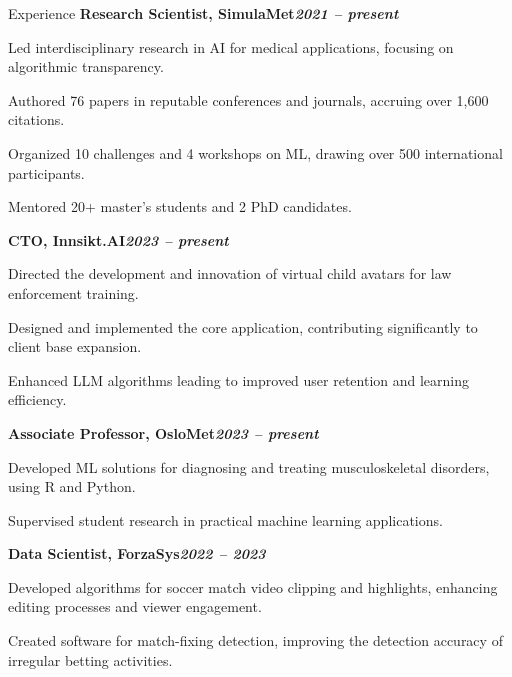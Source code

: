 \begin{rubric}{Experience}
%
\entry*[]%
\textbf{Research Scientist, SimulaMet\hfill\textit{2021 -- present}} \par
\begin{compactitem}
\item Led interdisciplinary research in AI for medical applications, focusing on algorithmic transparency.
\item Authored 76 papers in reputable conferences and journals, accruing over 1,600 citations.
\item Organized 10 challenges and 4 workshops on ML, drawing over 500 international participants.
\item Mentored 20+ master's students and 2 PhD candidates.
\vspace{-12pt}
\end{compactitem}
%
\entry*[]%
\textbf{CTO, Innsikt.AI\hfill\textit{2023 -- present}} \par
\begin{compactitem}
\item Directed the development and innovation of virtual child avatars for law enforcement training.
\item Designed and implemented the core application, contributing significantly to client base expansion.
\item Enhanced LLM algorithms leading to improved user retention and learning efficiency.
\vspace{-12pt}
\end{compactitem}
%
\entry*[]%
\textbf{Associate Professor, OsloMet\hfill\textit{2023 -- present}} \par
\begin{compactitem}
\item Developed ML solutions for diagnosing and treating musculoskeletal disorders, using R and Python.
\item Supervised student research in practical machine learning applications.
\vspace{-12pt}
\end{compactitem}
%
\entry*[]%
\textbf{Data Scientist, ForzaSys\hfill\textit{2022 -- 2023}} \par
\begin{compactitem}
\item Developed algorithms for soccer match video clipping and highlights, enhancing editing processes and viewer engagement.
\item Created software for match-fixing detection, improving the detection accuracy of irregular betting activities.

\end{compactitem}
\end{rubric}

